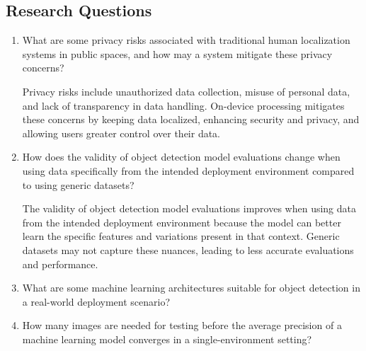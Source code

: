 \subsection{Research Questions}
\begin{enumerate}
    \item What are some privacy risks associated with traditional human localization systems in public spaces, and how may a system mitigate these privacy concerns?

    Privacy risks include unauthorized data collection, misuse of personal data, and lack of transparency in data handling. On-device processing mitigates these concerns by keeping data localized, enhancing security and privacy, and allowing users greater control over their data.

    \item How does the validity of object detection model evaluations change when using data specifically from the intended deployment environment compared to using generic datasets?

    The validity of object detection model evaluations improves when using data from the intended deployment environment because the model can better learn the specific features and variations present in that context. Generic datasets may not capture these nuances, leading to less accurate evaluations and performance.

    \item What are some machine learning architectures suitable for object detection in a real-world deployment scenario?
    \item How many images are needed for testing before the average precision of a machine learning model converges in a single-environment setting?
\end{enumerate}


